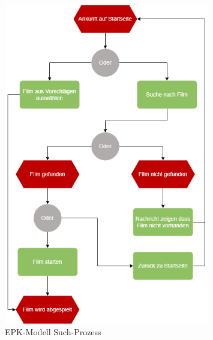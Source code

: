 \begin{appendix}
    \begin{figure}[ht]
        \centering
        \includegraphics[width=0.8\textwidth]{images/ReQ_MovieSearch_EPK}
        \caption{EPK-Modell Such-Prozess}
        \label{fig:epk_search}
    \end{figure}

\end{appendix}